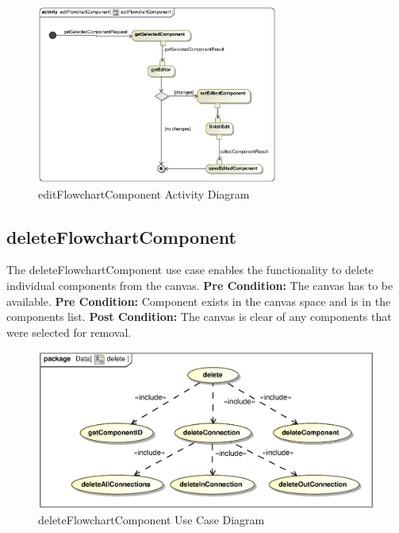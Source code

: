 \documentclass[12pt,a4paper,titlepage]{article}
\begin{document}
\begin{figure}[H]
  \centering
\includegraphics[width=300px]{editFlowchartComponentActivity.eps}
\caption{editFlowchartComponent Activity Diagram}
\end{figure}


\newpage
\subsection{deleteFlowchartComponent}
The deleteFlowchartComponent use case enables the functionality to delete individual components from the canvas.\newline\newline
\textbf{Pre Condition:} The canvas has to be available. \newline
\textbf{Pre Condition:} Component exists in the canvas space and is in the components list.\newline\newline
\textbf{Post Condition:} The canvas is clear of any components that were selected for removal.

\begin{figure}[H]
  \centering
\includegraphics[width=500px]{delete.eps}
\caption{deleteFlowchartComponent Use Case Diagram}
\end{figure}
\end{document}
